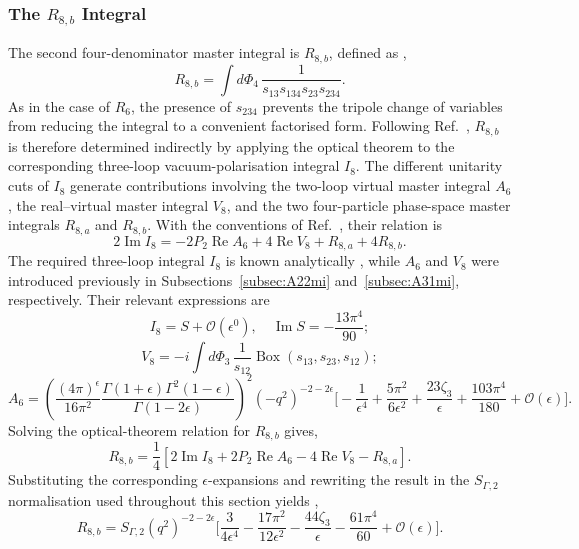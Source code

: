 \subsubsection*{The $R_{8,b}$ Integral}

The second four-denominator master integral is $R_{8,b}$, defined as
\cite{GehrmannDeRidder0311276},
\begin{equation}
    R_{8,b} = \int d\Phi_4\,\frac1{s_{13}s_{134}s_{23}s_{234}}.
\end{equation}
As in the case of $R_6$, the presence of $s_{234}$ prevents the tripole change of variables from
reducing the integral to a convenient factorised form. Following
Ref.~\cite{GehrmannDeRidder0311276}, $R_{8,b}$ is therefore determined indirectly by applying
the optical theorem to the corresponding three-loop vacuum-polarisation integral $I_8$. The
different unitarity cuts of $I_8$ generate contributions involving the two-loop virtual master
integral $A_6$, the real--virtual master integral $V_8$, and the two four-particle phase-space
master integrals $R_{8,a}$ and $R_{8,b}$. With the conventions of
Ref.~\cite{GehrmannDeRidder0311276}, their relation is
\begin{equation}
    2\operatorname{Im}I_8 = -2P_2\operatorname{Re}A_6+4\operatorname{Re}V_8+R_{8,a}+4R_{8,b}.
\end{equation}
The required three-loop integral $I_8$ is known analytically
\cite{GehrmannDeRidder0311276}, while $A_6$ and $V_8$ were introduced previously in
Subsections~\ref{subsec:A22mi} and~\ref{subsec:A31mi}, respectively. Their relevant expressions
are
\begin{equation}
    I_8 = S + \mathcal O(\epsilon^0),\quad \operatorname{Im}S = -\frac{13\pi^4}{90};
\end{equation}
\begin{equation}
    V_8 = -i\int d\Phi_3\,\frac1{s_{12}}\operatorname{Box}(s_{13}, s_{23}, s_{12});
\end{equation}
\begin{equation}
    A_6 = \left(\frac{(4\pi)^\epsilon}{16\pi^2}\frac{\Gamma(1+\epsilon)\Gamma^2(1-\epsilon)}{\Gamma(1-2\epsilon)}\right)^2\!\left(-q^2\right)^{-2-2\epsilon}\Bigg[-\frac1{\epsilon^4}+\frac{5\pi^2}{6\epsilon^2}+\frac{23\zeta_3}\epsilon+\frac{103\pi^4}{180}+\mathcal O(\epsilon)\Bigg].
\end{equation}
Solving the optical-theorem relation for $R_{8,b}$ gives,
\begin{equation}
    R_{8,b}=\frac14\left[2\operatorname{Im}I_8+2P_2\operatorname{Re}A_6-4\operatorname{Re}V_8-R_{8,a}\right].
\end{equation}
Substituting the corresponding $\epsilon$-expansions and rewriting the result in the
$S_{\Gamma,2}$ normalisation used throughout this section yields \cite{GehrmannDeRidder0311276},
\begin{equation}
    R_{8,b} = S_{\Gamma,2}\!\left(q^2\right)^{-2-2\epsilon}\Bigg[\frac3{4\epsilon^4}-\frac{17\pi^2}{12\epsilon^2}-\frac{44\zeta_3}{\epsilon}-\frac{61\pi^4}{60}+\mathcal O(\epsilon)\Bigg].
\end{equation}

